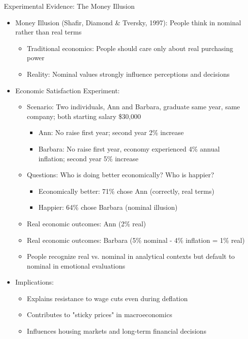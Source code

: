 \documentclass[10pt]{beamer}
\begin{document}
\begin{frame}{Experimental Evidence: The Money Illusion}
  \begin{itemize}[<+->]
    \item Money Illusion (Shafir, Diamond \& Tversky, 1997): People think in nominal rather than real terms
      \begin{itemize}
        \item Traditional economics: People should care only about real purchasing power
        \item Reality: Nominal values strongly influence perceptions and decisions
      \end{itemize}
    \item Economic Satisfaction Experiment:
      \begin{itemize}
        \item Scenario: Two individuals, Ann and Barbara, graduate same year, same company; both starting salary 
          \$30,000
          \begin{itemize}
            \item Ann: No raise first year; second year 2\% increase
            \item Barbara: No raise first year, economy experienced 4\% annual inflation; second year 5\% increase 
          \end{itemize}
        \item Questions: Who is doing better economically? Who is happier?
          \begin{itemize}
            \item Economically better: 71\% chose Ann (correctly, real terms)
            \item Happier: 64\% chose Barbara (nominal illusion)
          \end{itemize}
        \item Real economic outcomes: Ann (2\% real)
        \item Real economic outcomes: Barbara (5\% nominal - 4\% inflation = 1\% real)
        \item People recognize real vs. nominal in analytical contexts but default to nominal in emotional evaluations
      \end{itemize}
    \item Implications:
      \begin{itemize}
        \item Explains resistance to wage cuts even during deflation
        \item Contributes to "sticky prices" in macroeconomics
        \item Influences housing markets and long-term financial decisions
      \end{itemize}
  \end{itemize}
\end{frame}
\end{document}
